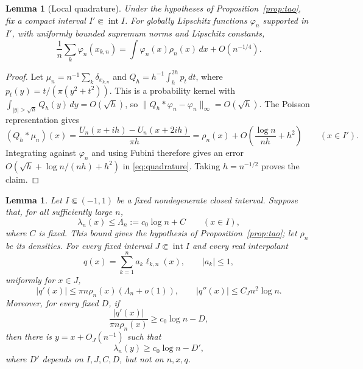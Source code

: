 \documentclass[11pt]{article}
\newtheorem{lemma}[theorem]{Lemma}
\theoremstyle{remark}
\numberwithin{equation}{section}
\begin{document}
\begin{lemma}[Local quadrature]\label{lem:quadrature}
Under the hypotheses of Proposition~\ref{prop:tao}, fix a compact
interval \(I'\Subset\operatorname{int}I\).
For globally Lipschitz functions \(\varphi_n\) supported in \(I'\),
with uniformly bounded supremum norms and Lipschitz constants,
\begin{equation}\label{eq:quadrature}
 \frac1n\sum_k \varphi_n(x_{k,n})
 =\int \varphi_n(x)\rho_n(x)\,dx+O(n^{-1/4}).
\end{equation}
\end{lemma}

\begin{proof}
Let \(\mu_n=n^{-1}\sum_k\delta_{x_{k,n}}\) and
\(Q_h=h^{-1}\int_h^{2h}p_t\,dt\), where
\(p_t(y)=t/(\pi(y^2+t^2))\). This is a probability kernel with
\(\int_{|y|>\sqrt h}Q_h(y)\,dy=O(\sqrt h)\), so
\(\|Q_h*\varphi_n-\varphi_n\|_\infty=O(\sqrt h)\).
The Poisson representation gives
\[
 (Q_h*\mu_n)(x)=\frac{U_n(x+ih)-U_n(x+2ih)}{\pi h}
 =\rho_n(x)+O\!\left(\frac{\log n}{nh}+h^2\right)
 \qquad(x\in I').
\]
Integrating against \(\varphi_n\) and using Fubini therefore gives
an error \(O(\sqrt h+\log n/(nh)+h^2)\) in
\eqref{eq:quadrature}. Taking \(h=n^{-1/2}\) proves the claim.
\end{proof}

\begin{lemma}\label{lem:local}
Let \(I\Subset(-1,1)\) be a fixed nondegenerate closed interval. Suppose that,
for all sufficiently large \(n\),
\begin{equation}\label{eq:local-upper}
 \lambda_n(x)\le \Lambda_n:=c_0\log n+C\qquad(x\in I),
\end{equation}
where \(C\) is fixed. This bound gives the hypothesis of
Proposition~\ref{prop:tao}; let \(\rho_n\) be its densities.
For every fixed interval \(J\Subset\operatorname{int}I\) and every
real interpolant
\[
 q(x)=\sum_{k=1}^n a_k\ell_{k,n}(x),\qquad |a_k|\le1,
\]
uniformly for \(x\in J\),
\begin{equation}\label{eq:derivative-bounds}
 |q'(x)|\le \pi n\rho_n(x)(\Lambda_n+o(1)),\qquad
 |q''(x)|\le C_Jn^2\log n.
\end{equation}
Moreover, for every fixed \(D\), if
\begin{equation}\label{eq:large-derivative}
 \frac{|q'(x)|}{\pi n\rho_n(x)}\ge c_0\log n-D,
\end{equation}
then there is \(y=x+O_J(n^{-1})\) such that
\begin{equation}\label{eq:nearby-peak}
 \lambda_n(y)\ge c_0\log n-D',
\end{equation}
where \(D'\) depends on \(I,J,C,D\), but not on \(n,x,q\).
\end{lemma}
\end{document}

